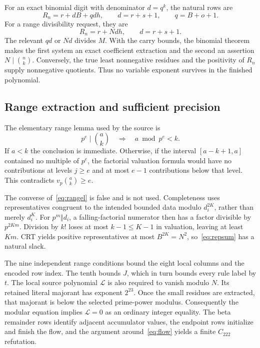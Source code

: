 \documentclass[11pt]{article}
\theoremstyle{definition}\newtheorem{definition}[theorem]{Definition}
\theoremstyle{remark}\newtheorem{remark}[theorem]{Remark}
\begin{document}
For an exact binomial digit with denominator $d=q^k$, the natural rows are
\[
 R_n=r+dB+qd h,\qquad d=r+s+1,\qquad q=B+o+1.
\]
For a range divisibility request, they are
\[
 R_n=r+Nd h,\qquad d=r+s+1.
\]
The relevant $qd$ or $Nd$ divides $M$. With the carry bounds, the binomial theorem makes the first system an exact coefficient extraction and the second an assertion $N\mid\binom nk$. Conversely, the true least nonnegative residues and the positivity of $R_n$ supply nonnegative quotients. Thus no variable exponent survives in the finished polynomial.

\subsection{Range extraction and sufficient precision}

The elementary range lemma used by the source is
\begin{equation}\label{eq:rangel}
 p^e\mid\binom ak\quad\Longrightarrow\quad a\bmod p^e<k.
\end{equation}
If $a<k$ the conclusion is immediate. Otherwise, if the interval
$[a-k+1,a]$ contained no multiple of $p^e$, the factorial valuation formula would have no contributions at levels $j\ge e$ and at most $e-1$ contributions below that level. This contradicts $v_p\binom ak\ge e$.

The converse of~\eqref{eq:rangel} is false and is not used. Completeness uses representatives congruent to the intended bounded data modulo $d_i^{2K}$, rather than merely $d_i^K$. For $p^m\Vert d_i$, a falling-factorial numerator then has a factor divisible by $p^{2Km}$. Division by $k!$ loses at most $k-1\le K-1$ in valuation, leaving at least $Km$. CRT yields positive representatives at most $B^{2K}=N^2$, so~\eqref{eq:repsum} has a natural slack.

The nine independent range conditions bound the eight local columns and the encoded row index. The tenth bounds $J$, which in turn bounds every rule label by $t$. The local source polynomial $\mathcal L$ is also required to vanish modulo $N$. Its retained literal majorant has exponent $2^{23}$. Once the small residues are extracted, that majorant is below the selected prime-power modulus. Consequently the modular equation implies $\mathcal L=0$ as an ordinary integer equality. The beta remainder rows identify adjacent accumulator values, the endpoint rows initialize and finish the flow, and the argument around~\eqref{eq:flow} yields a finite $C_{222}$ refutation.
\end{document}
